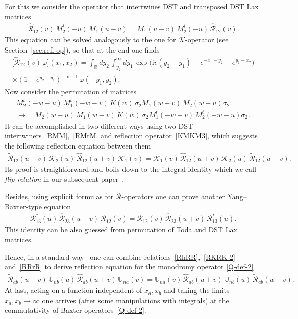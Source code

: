 \documentclass[11pt]{article}
\numberwithin{equation}{section}
\theoremstyle{plain}
\theoremstyle{definition}
\newcommand{\MMO}{\mathbb{U}}
\renewcommand{\phi}{\varphi}
\renewcommand{\imath}{\mathrm{i}}
\begin{document}
For this we consider the operator that intertwines DST and transposed DST Lax matrices 
\begin{align}\label{RMtM}
	\widehat{\mathcal{R}}_{12}(v) \, M_2^t(-u) \, M_1(u - v) = M_1(u - v) \, M_2^t(-u) \, \widehat{\mathcal{R}}_{12}(v).
\end{align}
This equation can be solved analogously to the one for $\mathcal{K}$-operator (see Section~\ref{sec:refl-op}), so that at the end one finds
\begin{multline} \label{Rhat}
	\bigl[ \widehat{\mathcal{R}}_{12}(v) \, \phi \bigr] (x_1, x_2) = \int_\mathbb{R} dy_2 \, \int_{y_2}^\infty dy_1 \, \exp \bigl( \imath v (y_2 - y_1) - e^{-x_1 - y_2} - e^{y_1- x_2 } \bigr) \\[2pt]
	\times (1 - e^{y_2 - y_1})^{-\imath v - 1} \, \phi(-y_1, y_2).
\end{multline}
Now consider the permutation of matrices
\begin{multline}
	M_2^t(-w-u)\, M_1^t(-w - v) \, K(w) \, \sigma_2 M_1(w - v) \, M_2(w - u) \sigma_2 \\[6pt]
	\longrightarrow \quad  M_2( w - u) \, M_1(w - v) \, K(w) \, \sigma_2 M_1^t(- w - v) \, M_2^t(-w - u) \sigma_2.
\end{multline}
It can be accomplished in two different ways using two DST intertwiners~\eqref{RMM},~\eqref{RMtM} and reflection operator~\eqref{KMKM3}, which suggests the following reflection equation between them
\begin{align}\label{RKRK-2}
	\widetilde{\mathcal{R}}_{12}(u - v) \, \mathcal{K}_2(u) \, \widehat{\mathcal{R}}_{12} (u + v) \, \mathcal{K}_1(v) = \mathcal{K}_1(v)  \, \widehat{\mathcal{R}}_{12} (u + v)  \, \mathcal{K}_2(u) \, \widetilde{\mathcal{R}}_{12}(u - v).
\end{align}
Its proof is straightforward and boils down to the integral identity which we call \textit{flip relation} in our subsequent paper~\cite{BDK}. 

Besides, using explicit formulas for $\mathcal{R}$-operators one can prove another Yang--Baxter-type equation
\begin{align}\label{RRrR}
	\mathcal{R}^*_{13}(u) \, \widehat{\mathcal{R}}_{23}(u + v) \, \mathcal{R}_{12} (v) = \mathcal{R}_{12} (v) \, \widehat{\mathcal{R}}_{23}(u + v) \, \mathcal{R}^*_{13}(u).
\end{align}
This identity can be also guessed from permutation of Toda and DST Lax matrices.

Hence, in a standard way~\cite{Skl} one can combine relations~\eqref{RhRR},~\eqref{RKRK-2} and~\eqref{RRrR} to derive reflection equation for the monodromy operator \eqref{Q-def-2}
\begin{align}
	\widetilde{\mathcal{R}}_{ab}(u - v) \, \MMO_{nb}(u) \, \widehat{\mathcal{R}}_{ab} (u + v) \, \MMO_{na}(v) = \MMO_{na}(v) \, \widehat{\mathcal{R}}_{ab} (u + v)  \, \MMO_{nb}(u) \, \widetilde{\mathcal{R}}_{ab}(u - v).
\end{align}
At last, acting on a function independent of $x_a, x_b$ and taking the limits $x_a, x_b \to \infty$ one arrives (after some manipulations with integrals) at the commutativity of Baxter operators~\eqref{Q-def-2}.
\end{document}
